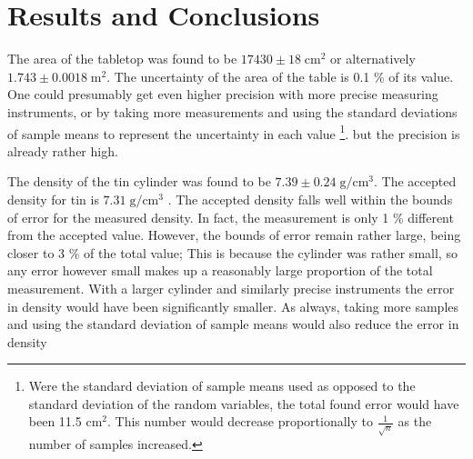 \documentclass[11pt]{article}
\begin{document}
\section{Results and Conclusions}
The area of the tabletop was found to be \( 17430 \pm 18 \; \mathrm{cm}^2\) or alternatively \( 1.743 \pm 0.0018 \; \mathrm{m}^2\). The uncertainty of the area of the table is 0.1 \% of its value. One could presumably get even higher precision with more precise measuring instruments, or by taking more measurements and using the standard deviations of sample means to represent the uncertainty in each value \footnote{Were the standard deviation of sample means used as opposed to the standard deviation of the random variables, the total found error would have been 11.5 \(\mathrm{cm}^2\). This number would decrease proportionally to \( \frac{1}{\sqrt{n}}\) as the number of samples increased. }.  but the precision is already rather high.

The density of the tin cylinder was found to be \( 7.39 \pm 0.24 \; \mathrm{g} / \mathrm {cm}^3 \). The accepted density for tin is \( 7.31 \; \mathrm{g} / \mathrm  {cm}^3 \) \cite{DUMMY:1}. The accepted density falls well within the bounds of error for the measured density. In fact, the measurement is only 1 \% different from the accepted value. However, the bounds of error remain rather large, being closer to 3 \% of the total value; This is because the cylinder was rather small, so any error however small makes up a reasonably large proportion of the total measurement. With a larger cylinder and similarly precise instruments the error in density would have been significantly smaller. As always, taking more samples and using the standard deviation of sample means would also reduce the error in density





\end{document}
